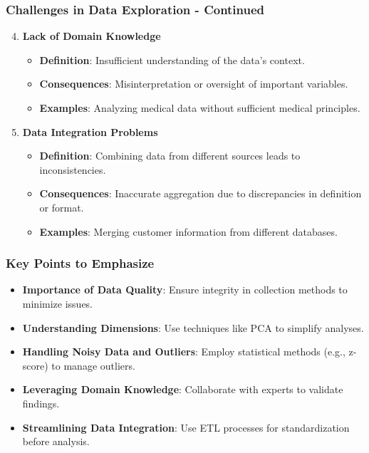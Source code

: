 \documentclass[aspectratio=169]{beamer}
\begin{document}
\begin{frame}[fragile]
    \frametitle{Challenges in Data Exploration - Continued}
    \begin{enumerate}
        \setcounter{enumi}{3}
        \item \textbf{Lack of Domain Knowledge}
        \begin{itemize}
            \item \textbf{Definition}: Insufficient understanding of the data's context.
            \item \textbf{Consequences}: Misinterpretation or oversight of important variables.
            \item \textbf{Examples}: Analyzing medical data without sufficient medical principles.
        \end{itemize}

        \item \textbf{Data Integration Problems}
        \begin{itemize}
            \item \textbf{Definition}: Combining data from different sources leads to inconsistencies.
            \item \textbf{Consequences}: Inaccurate aggregation due to discrepancies in definition or format.
            \item \textbf{Examples}: Merging customer information from different databases.
        \end{itemize}
    \end{enumerate}
\end{frame}

\begin{frame}[fragile]
    \frametitle{Key Points to Emphasize}
    \begin{itemize}
        \item \textbf{Importance of Data Quality}: Ensure integrity in collection methods to minimize issues.
        \item \textbf{Understanding Dimensions}: Use techniques like PCA to simplify analyses.
        \item \textbf{Handling Noisy Data and Outliers}: Employ statistical methods (e.g., z-score) to manage outliers.
        \item \textbf{Leveraging Domain Knowledge}: Collaborate with experts to validate findings.
        \item \textbf{Streamlining Data Integration}: Use ETL processes for standardization before analysis.
    \end{itemize}
\end{frame}
\end{document}
